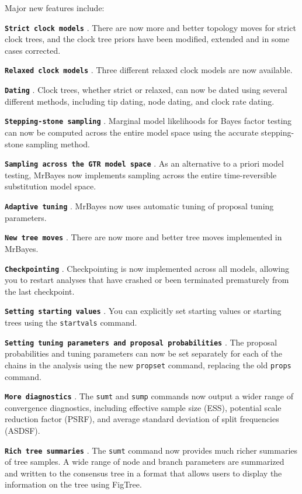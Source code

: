 \documentclass[12pt]{book}
\newcommand{\ttt}[1]{\texttt{#1} }
\newcommand{\tb}[1]{\ttt{\textbf{#1}} }
\begin{document}
Major new features include:

\tb{Strict clock models}. There are now more and better topology moves for strict clock trees, and
the clock tree priors have been modified, extended and in some cases corrected.

\tb{Relaxed clock models}. Three different relaxed clock models are now available.

\tb{Dating}. Clock trees, whether strict or relaxed, can now be dated using several different
methods, including tip dating, node dating, and clock rate dating.

\tb{Stepping-stone sampling}. Marginal model likelihoods for Bayes factor testing can now be
computed across the entire model space using the accurate stepping-stone sampling method.

\tb{Sampling across the GTR model space}. As an alternative to a priori model testing, MrBayes now
implements sampling across the entire time-reversible substitution model space.

\tb{Adaptive tuning}. MrBayes now uses automatic tuning of proposal tuning parameters.

\tb{New tree moves}. There are now more and better tree moves implemented in MrBayes.

\tb{Checkpointing}. Checkpointing is now implemented across all models, allowing you to restart
analyses that have crashed or been terminated prematurely from the last checkpoint.

\tb{Setting starting values}. You can explicitly set starting values or starting trees using the
\ttt{startvals} command.

\tb{Setting tuning parameters and proposal probabilities}. The proposal probabilities and tuning
parameters can now be set separately for each of the chains in the analysis using the new
\ttt{propset} command, replacing the old \ttt{props} command.

\tb{More diagnostics}. The \ttt{sumt} and \ttt{sump} commands now output a wider range of
convergence diagnostics, including effective sample size (ESS), potential scale reduction factor
(PSRF), and average standard deviation of split frequencies (ASDSF).

\tb{Rich tree summaries}. The \ttt{sumt} command now provides much richer summaries of tree
samples. A wide range of node and branch parameters are summarized and written to the consensus
tree in a format that allows users to display the information on the tree using FigTree.
\end{document}
